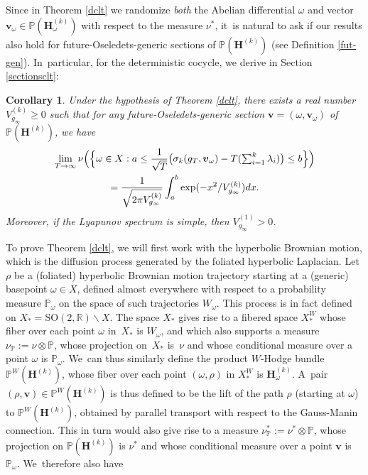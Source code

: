 \documentclass[JEP,XML,SOM,Unicode,published]{cedram}
\theoremstyle{plain}
\newtheorem{cor}[thm]{Corollary}
\theoremstyle{definition}
\numberwithin{equation}{subsection}
\newcommand\bP{\mathbb{P}}
\newcommand\bR{\mathbb{R}}\let\R\bR
\newcommand{\SO}{\mathrm{SO}}
\newcommand{\bfH}{\boldsymbol{H}}
\newcommand{\bfv}{\boldsymbol{v}}
\newcommand{\defeq}{:=}
\begin{document}
Since in Theorem \ref{dclt} we randomize \emph{both} the Abelian differential $\omega$ and vector $\bfv_\omega \in \bP(\bfH_\omega^{(k)})$ with respect to the measure $\nu^*$, it~is natural to ask if our results also hold for future-Oseledets-generic sections of $\bP(\bfH^{(k)})$ (see Definition \ref{fut-gen}). In~particular, for the deterministic cocycle, we derive in Section \ref{sectionsclt}:

\begin{cor}
Under the hypothesis of Theorem \ref{dclt}, there exists a real number $V^{(k)}_{g_\infty} \geq 0$ such that for any future-Oseledets-generic section $\bfv=(\omega,\bfv_{\omega})$ of $\bP(\bfH^{(k)})$, we have
\begin{multline*}
\lim_{T\to\infty} \nu\Bigl(\Bigl\{\omega\in X :a \leq \frac{1}{\sqrt{T}} \bigl(\sigma_k(g_{T}, \bfv_\omega)- T(\textstyle\sum_{i=1}^k \lambda_i) \bigr) \leq b \Bigr\} \Bigr)
\\= \frac{1}{\sqrt{2\pi V^{(k)}_{g_\infty}}}\int_a^b\exp(-x^2/ V^{(k)}_{g_\infty})dx.
\end{multline*}
Moreover, if the Lyapunov spectrum is simple, then $V^{(1)}_{g_\infty} > 0$.
\end{cor}

To prove Theorem \ref{dclt}, we will first work with the hyperbolic Brownian motion, which is the diffusion process generated by the foliated hyperbolic Laplacian. Let $\rho$ be a (foliated) hyperbolic Brownian motion trajectory starting at a (generic) basepoint $\omega \in X$, defined almost everywhere with respect to a probability measure $\bP_\omega$ on the space of such trajectories $W_\omega$. This process is in fact defined on $X_* = \SO(2,\bR)\backslash X$. The space $X_*$ gives rise to a fibered space $X^{W}_*$ whose fiber over each point $\omega$ in~$X_*$ is $W_\omega$, and which also supports a measure $\nu_{\bP} \defeq \nu \otimes \bP$, whose projection on~$X_*$ is~$\nu$ and whose conditional measure over a point $\omega$ is $\bP_\omega$. We~can thus similarly define the product $W$-Hodge bundle $\bP^W(\bfH^{(k)})$, whose fiber over each point $(\omega,\rho)$ in $X^{W}_*$ is $\bfH^{(k)}_\omega$. A~pair $(\rho,\bfv) \in \bP^W(\bfH^{(k)})$ is thus defined to be the lift of the path $\rho$ (starting at $\omega$) to $\bP^W(\bfH^{(k)})$, obtained by parallel transport with respect to the Gauss-Manin connection. This in turn would also give rise to a measure $\nu^*_{\bP}\defeq \nu^* \otimes \bP$, whose projection on $\bP(\bfH^{(k)})$ is $\nu^*$ and whose conditional measure over a point $\bfv$ is $\bP_\omega$. We~therefore also have
\end{document}
